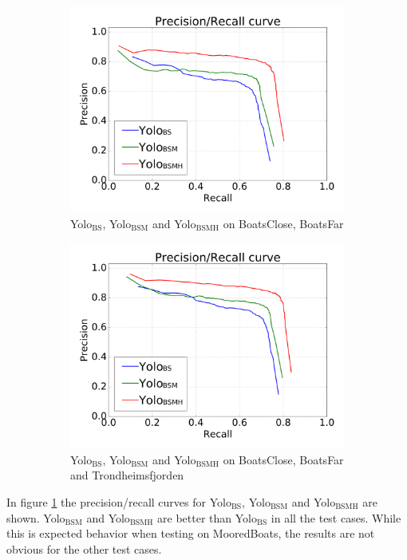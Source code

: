 \begin{figure}[h!]
\begin{subfigure}{.5\textwidth}
  \centering
  \includegraphics[width=0.8\linewidth]{results/case_tr_moor/prec_recall/bcbf-eps2.png}
  \caption{Yolo$_{\text{BS}}$, Yolo$_{\text{BSM}}$ and Yolo$_{\text{BSMH}}$ on BoatsClose, BoatsFar}
\end{subfigure}%
\begin{subfigure}{.5\textwidth}
  \centering
  \includegraphics[width=.8\linewidth]{results/case_tr_moor/prec_recall/bcbftrf-eps2.png}
  \caption{Yolo$_{\text{BS}}$, Yolo$_{\text{BSM}}$ and Yolo$_{\text{BSMH}}$  on BoatsClose, BoatsFar and Trondheimsfjorden}
\end{subfigure}
\caption{}
\label{fig:prec_rec_case_moor}

\end{figure}
\noindent
In figure \ref{fig:prec_rec_case_moor} the precision/recall curves for Yolo$_{\text{BS}}$, Yolo$_{\text{BSM}}$ and Yolo$_{\text{BSMH}}$ are shown. Yolo$_{\text{BSM}}$ and Yolo$_{\text{BSMH}}$ are better than Yolo$_{\text{BS}}$ in all the test cases. While this is expected behavior when testing on MooredBoats, the results are not obvious for the other test cases. 


